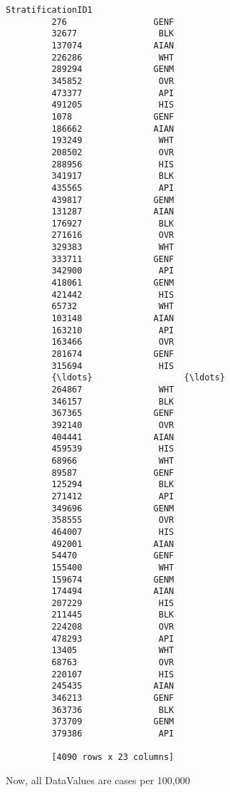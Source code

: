 \documentclass[11pt]{article}
\begin{document}
\begin{Verbatim}[commandchars=\\\{\}]
                StratificationID1  
         276                 GENF  
         32677                BLK  
         137074              AIAN  
         226286               WHT  
         289294              GENM  
         345852               OVR  
         473377               API  
         491205               HIS  
         1078                GENF  
         186662              AIAN  
         193249               WHT  
         208502               OVR  
         288956               HIS  
         341917               BLK  
         435565               API  
         439817              GENM  
         131287              AIAN  
         176927               BLK  
         271616               OVR  
         329383               WHT  
         333711              GENF  
         342900               API  
         418061              GENM  
         421442               HIS  
         65732                WHT  
         103148              AIAN  
         163210               API  
         163466               OVR  
         281674              GENF  
         315694               HIS  
         {\ldots}                  {\ldots}  
         264867               WHT  
         346157               BLK  
         367365              GENF  
         392140               OVR  
         404441              AIAN  
         459539               HIS  
         68966                WHT  
         89587               GENF  
         125294               BLK  
         271412               API  
         349696              GENM  
         358555               OVR  
         464007               HIS  
         492001              AIAN  
         54470               GENF  
         155400               WHT  
         159674              GENM  
         174494              AIAN  
         207229               HIS  
         211445               BLK  
         224208               OVR  
         478293               API  
         13405                WHT  
         68763                OVR  
         220107               HIS  
         245435              AIAN  
         346213              GENF  
         363736               BLK  
         373709              GENM  
         379386               API  
         
         [4090 rows x 23 columns]
\end{Verbatim}
            
    Now, all DataValues are cases per 100,000
\end{document}
